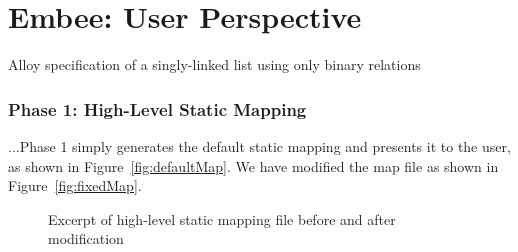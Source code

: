 \chapter{Embee: User Perspective}\label{ch:Embee1}

    \begin{Listing}[H]
    \caption{Alloy specification of a singly-linked list using only binary relations}
    \label{list:SimpleList1}
    \end{Listing}


\subsection{Phase 1: High-Level Static Mapping}\label{sec:phase1}

    ...Phase 1 simply generates the default static
    mapping and presents it to the user, as shown in Figure~\vref{fig:defaultMap}.  We
    have modified the map file as shown in Figure~\vref{fig:fixedMap}.

    \begin{figure}[H]
    \begin{singlespacing}
    \centering
    \caption[Excerpt of high-level static mapping file]{Excerpt of high-level static
    mapping file before and after modification}
    \end{singlespacing}
    \end{figure}



